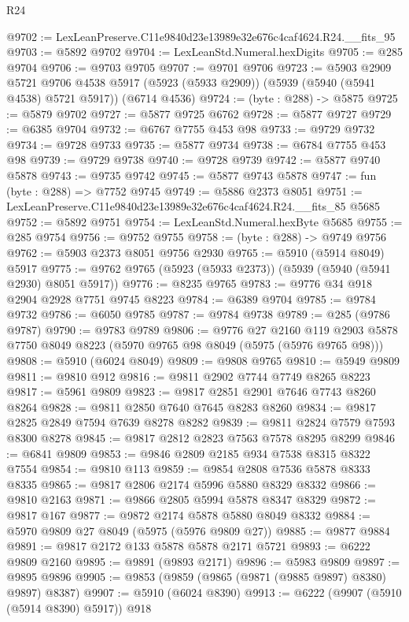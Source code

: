 \begin{lexlean}{R24}
\begin{coremodule}
@9702 := LexLeanPreserve.C11e9840d23e13989e32e676c4caf4624.R24.__fits_95
@9703 := @5892 @9702
@9704 := LexLeanStd.Numeral.hexDigits
@9705 := @285 @9704
@9706 := @9703 @9705
@9707 := @9701 @9706
@9723 := @5903
    @2909
    @5721
    @9706
    @4538
    @5917
    (@5923 (@5933 @2909))
    (@5939 (@5940 (@5941 @4538) @5721 @5917))
    (@6714 @4536)
@9724 := (byte : @288) -> @5875
@9725 := @5879 @9702
@9727 := @5877 @9725 @6762
@9728 := @5877 @9727
@9729 := @6385 @9704
@9732 := @6767 @7755 @453 @98
@9733 := @9729 @9732
@9734 := @9728 @9733
@9735 := @5877 @9734
@9738 := @6784 @7755 @453 @98
@9739 := @9729 @9738
@9740 := @9728 @9739
@9742 := @5877 @9740 @5878
@9743 := @9735 @9742
@9745 := @5877 @9743 @5878
@9747 := fun (byte : @288) => @7752 @9745
@9749 := @5886 @2373 @8051
@9751 := LexLeanPreserve.C11e9840d23e13989e32e676c4caf4624.R24.__fits_85 @5685
@9752 := @5892 @9751
@9754 := LexLeanStd.Numeral.hexByte @5685
@9755 := @285 @9754
@9756 := @9752 @9755
@9758 := (byte : @288) -> @9749 @9756
@9762 := @5903 @2373 @8051 @9756 @2930
@9765 := @5910 (@5914 @8049) @5917
@9775 := @9762 @9765 (@5923 (@5933 @2373)) (@5939 (@5940 (@5941 @2930) @8051 @5917))
@9776 := @8235 @9765
@9783 := @9776 @34 @918 @2904 @2928 @7751 @9745 @8223
@9784 := @6389 @9704
@9785 := @9784 @9732
@9786 := @6050 @9785
@9787 := @9784 @9738
@9789 := @285 (@9786 @9787)
@9790 := @9783 @9789
@9806 := @9776
    @27
    @2160
    @119
    @2903
    @5878
    @7750
    @8049
    @8223
    (@5970 @9765 @98 @8049 (@5975 (@5976 @9765 @98)))
@9808 := @5910 (@6024 @8049)
@9809 := @9808 @9765
@9810 := @5949 @9809
@9811 := @9810 @912
@9816 := @9811 @2902 @7744 @7749 @8265 @8223
@9817 := @5961 @9809
@9823 := @9817 @2851 @2901 @7646 @7743 @8260 @8264
@9828 := @9811 @2850 @7640 @7645 @8283 @8260
@9834 := @9817 @2825 @2849 @7594 @7639 @8278 @8282
@9839 := @9811 @2824 @7579 @7593 @8300 @8278
@9845 := @9817 @2812 @2823 @7563 @7578 @8295 @8299
@9846 := @6841 @9809
@9853 := @9846 @2809 @2185 @934 @7538 @8315 @8322 @7554
@9854 := @9810 @113
@9859 := @9854 @2808 @7536 @5878 @8333 @8335
@9865 := @9817 @2806 @2174 @5996 @5880 @8329 @8332
@9866 := @9810 @2163
@9871 := @9866 @2805 @5994 @5878 @8347 @8329
@9872 := @9817 @167
@9877 := @9872 @2174 @5878 @5880 @8049 @8332
@9884 := @5970 @9809 @27 @8049 (@5975 (@5976 @9809 @27))
@9885 := @9877 @9884
@9891 := @9817 @2172 @133 @5878 @5878 @2171 @5721
@9893 := @6222 @9809 @2160
@9895 := @9891 (@9893 @2171)
@9896 := @5983 @9809
@9897 := @9895 @9896
@9905 := @9853 (@9859 (@9865 (@9871 (@9885 @9897) @8380) @9897) @8387)
@9907 := @5910 (@6024 @8390)
@9913 := @6222 (@9907 (@5910 (@5914 @8390) @5917)) @918

\end{coremodule}
\end{lexlean}
